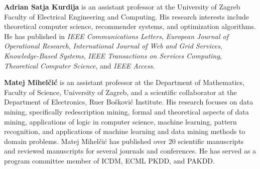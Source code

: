 \documentclass[a4paper,fleqn]{cas-dc}
\begin{document}


\printcredits

%
%






\textbf{Adrian Satja Kurdija} is an assistant professor at the University of Zagreb Faculty of Electrical Engineering and Computing. His research interests include theoretical computer science, recommender systems, and optimization algorithms. He has published in \textit{IEEE Communications Letters}, \textit{European Journal of Operational Research}, \textit{International Journal of Web and Grid Services}, \textit{Knowledge-Based Systems}, \textit{IEEE Transactions on Services Computing}, \textit{Theoretical Computer Science}, and \textit{IEEE Access}.
\endbio

\textbf{Matej Mihel\v{c}i\'c} is an assistant professor at the Department of Mathematics, Faculty of Science, University of Zagreb, and a scientific collaborator at the Department of Electronics, Ru{\dj}er Bo\v{s}kovi\'c Institute. His research focuses on data mining, specifically redescription mining, formal and theoretical aspects of data mining, applications of logic in computer science, machine learning, pattern recognition, and applications of machine learning and data mining methods to domain problems. Matej Mihel\v{c}i\'c has published over 20 scientific manuscripts and reviewed manuscripts for several journals and conferences. He has served as a program committee member of ICDM, ECML PKDD, and PAKDD.
\endbio
\end{document}
